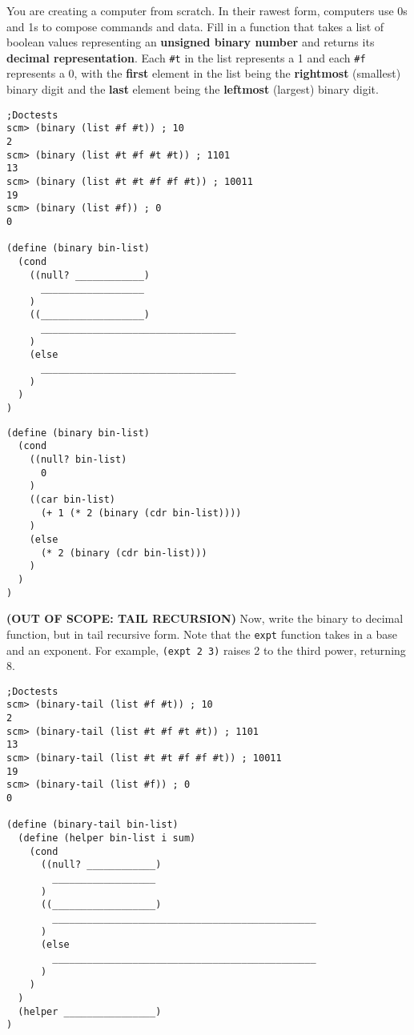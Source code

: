 \begin{blocksection}
\question
You are creating a computer from scratch. In their rawest form, computers use 0s and 1s to compose commands and data. Fill in a function that takes a list of boolean values representing an \textbf{unsigned binary number} and returns its \textbf{decimal representation}. Each \lstinline{#t} in the list represents a 1 and each \lstinline{#f} represents a 0, with the \textbf{first} element in the list being the \textbf{rightmost} (smallest) binary digit and the \textbf{last} element being the \textbf{leftmost} (largest) binary digit.
\\
\begin{lstlisting}
;Doctests
scm> (binary (list #f #t)) ; 10
2
scm> (binary (list #t #f #t #t)) ; 1101
13
scm> (binary (list #t #t #f #f #t)) ; 10011
19
scm> (binary (list #f)) ; 0
0

(define (binary bin-list)
  (cond
    ((null? ____________)
      __________________
    )
    ((__________________)
      __________________________________
    )
    (else
      __________________________________
    )
  )
)
\end{lstlisting}
\end{blocksection}

\begin{solution}
\begin{blocksection}
\begin{lstlisting}
(define (binary bin-list)
  (cond
    ((null? bin-list)
      0
    )
    ((car bin-list)
      (+ 1 (* 2 (binary (cdr bin-list))))
    )
    (else
      (* 2 (binary (cdr bin-list)))
    )
  )
)
\end{lstlisting}
\end{blocksection}
\end{solution}


\begin{blocksection}
\question 
\textbf{(OUT OF SCOPE: TAIL RECURSION)}
Now, write the binary to decimal function, but in tail recursive form. Note that the \lstinline{expt} function takes in a base and an exponent. For example, \lstinline{(expt 2 3)} raises 2 to the third power, returning 8.
\\
\begin{lstlisting}
;Doctests
scm> (binary-tail (list #f #t)) ; 10
2
scm> (binary-tail (list #t #f #t #t)) ; 1101
13
scm> (binary-tail (list #t #t #f #f #t)) ; 10011
19
scm> (binary-tail (list #f)) ; 0
0

(define (binary-tail bin-list)
  (define (helper bin-list i sum)
    (cond
      ((null? ____________)
        __________________
      )
      ((__________________)
        ______________________________________________
      )
      (else
        ______________________________________________
      )
    )
  )
  (helper ________________)
)
\end{lstlisting}
\end{blocksection}

